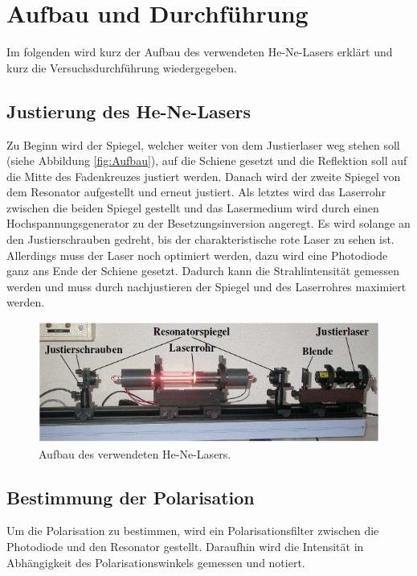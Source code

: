 \section{Aufbau und Durchführung}
\label{sec:Durchführung}
Im folgenden wird kurz der Aufbau des verwendeten He-Ne-Lasers erklärt und kurz die Versuchsdurchführung wiedergegeben.

\subsection{Justierung des He-Ne-Lasers}
Zu Beginn wird der Spiegel, welcher weiter von dem Justierlaser weg stehen soll (siehe Abbildung \eqref{fig:Aufbau}), auf die Schiene gesetzt und die Reflektion soll auf die Mitte des Fadenkreuzes justiert werden. Danach wird der zweite Spiegel von dem Resonator aufgestellt und erneut justiert. Als letztes wird das Laserrohr zwischen die beiden Spiegel gestellt und das Lasermedium wird durch einen Hochspannungsgenerator zu der Besetzungsinversion angeregt. Es wird solange an den Justierschrauben gedreht, bis der charakteristische rote Laser zu sehen ist. Allerdings muss der Laser noch optimiert werden, dazu wird eine Photodiode ganz ans Ende der Schiene gesetzt. Dadurch kann die Strahlintensität gemessen werden und muss durch nachjustieren der Spiegel und des Laserrohres maximiert werden.

\begin{figure}[H]
  \includegraphics[width=\linewidth]{Bilder/Aufbau.png}
  \caption{Aufbau des verwendeten He-Ne-Lasers. \cite{V61}}
  \label{fig:Aufbau}
\end{figure}

\subsection{Bestimmung der Polarisation}
Um die Polarisation zu bestimmen, wird ein Polarisationsfilter zwischen die Photodiode und den Resonator gestellt. Daraufhin wird die Intensität in Abhängigkeit des Polarisationswinkels gemessen und notiert.

